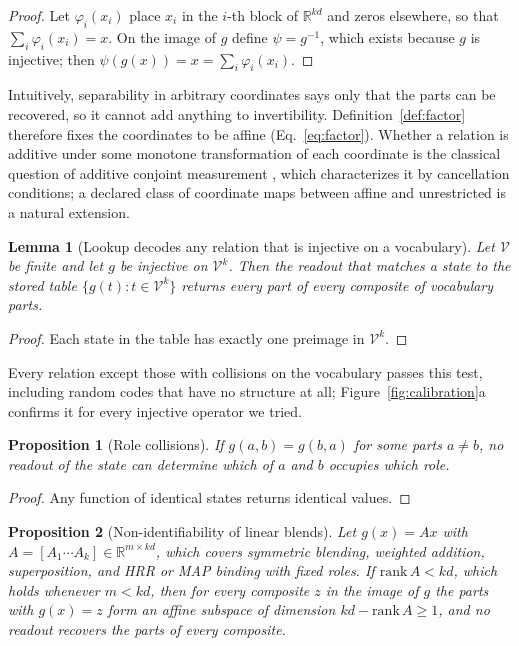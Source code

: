 \documentclass[10pt]{article}
\theoremstyle{plain}
\newtheorem{proposition}{Proposition}
\newtheorem{lemma}{Lemma}
\theoremstyle{remark}
\newcommand{\R}{\mathbb{R}}
\newcommand{\Voc}{\mathcal{V}}
\begin{document}
\begin{proof}
Let $\varphi_i(x_i)$ place $x_i$ in the $i$-th block of $\R^{kd}$ and zeros elsewhere, so that $\sum_i \varphi_i(x_i) = x$. On the image of $g$ define $\psi = g^{-1}$, which exists because $g$ is injective; then $\psi(g(x)) = x = \sum_i \varphi_i(x_i)$.
\end{proof}

\noindent
Intuitively, separability in arbitrary coordinates says only that the parts can be recovered, so it cannot add anything to invertibility. Definition~\ref{def:factor} therefore fixes the coordinates to be affine (Eq.~\ref{eq:factor}). Whether a relation is additive under some monotone transformation of each coordinate is the classical question of additive conjoint measurement \citep{luce1964}, which characterizes it by cancellation conditions; a declared class of coordinate maps between affine and unrestricted is a natural extension.

\begin{lemma}[Lookup decodes any relation that is injective on a vocabulary]
\label{lem:lookup}
Let $\Voc$ be finite and let $g$ be injective on $\Voc^k$. Then the readout that matches a state to the stored table $\{g(t) : t \in \Voc^k\}$ returns every part of every composite of vocabulary parts.
\end{lemma}

\begin{proof}
Each state in the table has exactly one preimage in $\Voc^k$.
\end{proof}

\noindent
Every relation except those with collisions on the vocabulary passes this test, including random codes that have no structure at all; Figure~\ref{fig:calibration}a confirms it for every injective operator we tried.

\begin{proposition}[Role collisions]
\label{prop:blend}
If $g(a, b) = g(b, a)$ for some parts $a \neq b$, no readout of the state can determine which of $a$ and $b$ occupies which role.
\end{proposition}

\begin{proof}
Any function of identical states returns identical values.
\end{proof}

\begin{proposition}[Non-identifiability of linear blends]
\label{prop:fiber}
Let $g(x) = Ax$ with $A = [A_1 \cdots A_k] \in \R^{m \times kd}$, which covers symmetric blending, weighted addition, superposition, and HRR or MAP binding with fixed roles. If $\mathrm{rank}\,A < kd$, which holds whenever $m < kd$, then for every composite $z$ in the image of $g$ the parts with $g(x) = z$ form an affine subspace of dimension $kd - \mathrm{rank}\,A \geq 1$, and no readout recovers the parts of every composite.
\end{proposition}
\end{document}
